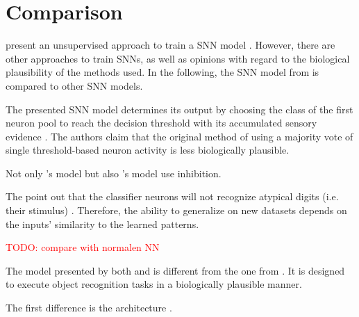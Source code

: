 \section{Comparison}
\label{sec:comparison}

\authorsSNN{} present an unsupervised approach to train a \ac{SNN} model \cite{SNN}.
However, there are other approaches to train \acp{SNN}, as well as opinions with regard to the biological plausibility of the methods used.
In the following, the \ac{SNN} model from \authorsSNN{} \cite{SNN} is compared to other \ac{SNN} models.


The presented \ac{SNN} model determines its output by 
choosing the class of the first neuron pool to reach the decision threshold with its accumulated sensory evidence \cite{STDP_like}.
The authors claim that the original method of using a majority vote of single threshold-based neuron activity is less biologically plausible.

Not only \authorsSTDPlike{}'s model \cite{STDP_like} but also \authorsSNN{}'s model \cite{SNN} use inhibition.

The \authorsSTDPlike{} point out that the classifier neurons will not recognize atypical digits (i.e. their stimulus) \cite{STDP_like}.
Therefore, the ability to generalize on new datasets depends on the inputs' similarity to the learned patterns.


\textcolor{red}{TODO: compare with normalen NN}

The model presented by both \authorsmultiScaleSTDP{} \cite{multi_scale_STDP} and \authorsSTDPvisFeat{} \cite{STDP_vis_feat} is different from the one from \authorsSNN{} \cite{SNN}.
It is designed to execute object recognition tasks in a biologically plausible manner.

The first difference is the architecture \cite{multi_scale_STDP,STDP_vis_feat}.

